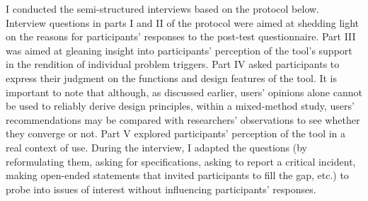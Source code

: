 I conducted the semi-structured interviews based on the protocol below. Interview questions in parts I and II of the protocol were aimed at shedding light on the reasons for participants’ responses to the post-test questionnaire. Part III was aimed at gleaning insight into participants’ perception of the tool’s support in the rendition of individual problem triggers. Part IV asked participants to express their judgment on the functions and design features of the tool. It is important to note that although, as discussed earlier, users’ opinions alone cannot be used to reliably derive design principles, within a mixed-method study, users’ recommendations may be compared with researchers’ observations to see whether they converge or not. Part V explored participants’ perception of the tool in a real context of use. During the interview, I adapted the questions (by reformulating them, asking for specifications, asking to report a critical incident, making open-ended statements that invited participants to fill the gap, etc.) to probe into issues of interest without influencing participants’ responses.

